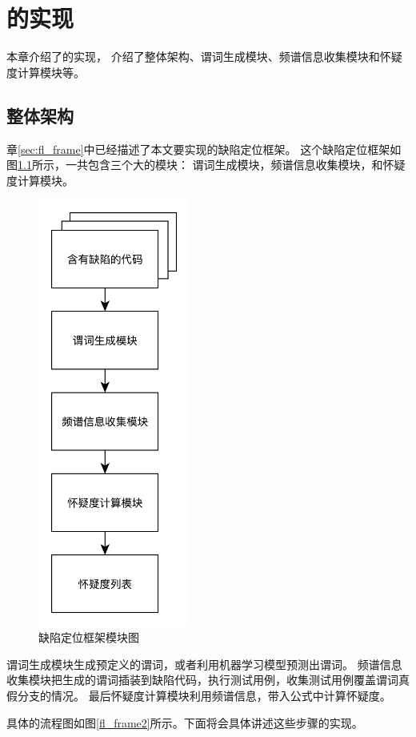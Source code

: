 \chapter{\toolname{}的实现}

本章介绍了\toolname{}的实现，
介绍了整体架构、谓词生成模块、频谱信息收集模块和怀疑度计算模块等。

\section{整体架构}

章\ref{sec:fl_frame}中已经描述了本文要实现的缺陷定位框架。
这个缺陷定位框架如图\ref{fl_frame1}所示，一共包含三个大的模块：
谓词生成模块，频谱信息收集模块，和怀疑度计算模块。
\begin{figure}[htbp] 
\centering 
\includegraphics[width=5cm]{figure/frame1} 
\caption{缺陷定位框架模块图} 
\label{fl_frame1}
\end{figure}

谓词生成模块生成预定义的谓词，或者利用机器学习模型预测出谓词。
频谱信息收集模块把生成的谓词插装到缺陷代码，执行测试用例，收集测试用例覆盖谓词真假分支的情况。
最后怀疑度计算模块利用频谱信息，带入公式中计算怀疑度。

具体的流程图如图\ref{fl_frame2}所示。下面将会具体讲述这些步骤的实现。

